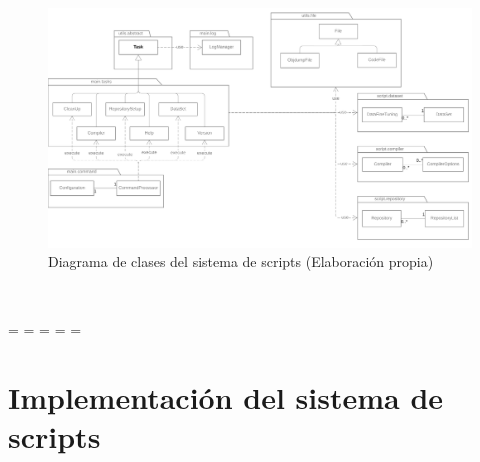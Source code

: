 \begin{figure}[H]
    \begin{center}
        \includegraphics[scale=0.2]{figuras/Capitulo_XX/UML_Script.png}
    \end{center}
    \caption[Diagrama de clases del sistema de scripts]{Diagrama de clases del sistema de scripts (Elaboración propia)}
    \label{fig:UML_Script}
\end{figure}\

\newpage
\paperwidth=\pdfpageheight
\paperheight=\pdfpagewidth
\pdfpageheight=\paperheight
\pdfpagewidth=\paperwidth
\headwidth=\textwidth

\section{Implementación del sistema de scripts}
\label{sec:implementacion_sistema_scripts}

